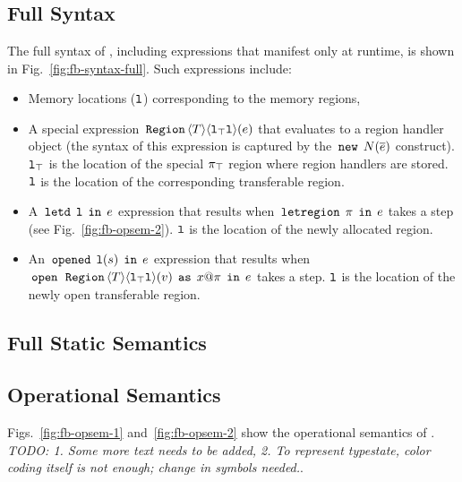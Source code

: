 %
%
\section{\fbname}

\subsection{Full Syntax}


The full syntax of \FB, including expressions that manifest only at
runtime, is shown in Fig.~\ref{fig:fb-syntax-full}. Such expressions
include:
\begin{itemize}
\item Memory locations ($\mathtt{l}$) corresponding to the memory regions,
\item A special expression $\,{\tt Region}\,\langle T \rangle\langle \mathtt{l}_{\top}\mathtt{l} \rangle(e)$ that evaluates to
a region handler object (the syntax of this expression is captured by
the $\,{\tt new}\,\;N(\overline{e})$ construct). $\mathtt{l}_{\top}$ is the
location of the special $\pi_{\top}$ region where region handlers are
stored. $\mathtt{l}$ is the location of the corresponding transferable
region.
\item A $\,{\tt letd}\,\;\mathtt{l}\;\,{\tt in}\,\;e$ expression that results when
$\,{\tt letregion}\,\;\pi\;\,{\tt in}\,\;e$ takes a step (see Fig.~\ref{fig:fb-opsem-2}).
$\mathtt{l}$ is the location of the newly allocated region.
\item An $\,{\tt opened}\,\;\mathtt{l}(s)\;\,{\tt in}\,\;e$ expression that results when
$\,{\tt open}\,\;\,{\tt Region}\,\langle T \rangle\langle \mathtt{l}_{\top}\mathtt{l} \rangle(v)\;\,{\tt as}\,\;x@\pi\;\,{\tt in}\,\;e$ takes a step. $\mathtt{l}$ is the
location of the newly open transferable region.
\end{itemize}

\subsection{Full Static Semantics}



\subsection{Operational Semantics}


Figs.~\ref{fig:fb-opsem-1} and~\ref{fig:fb-opsem-2} show the
operational semantics of \fbname. \emph{TODO: 1. Some more text needs
to be added, 2. To represent typestate, color coding itself is not
enough; change in symbols needed.}.






